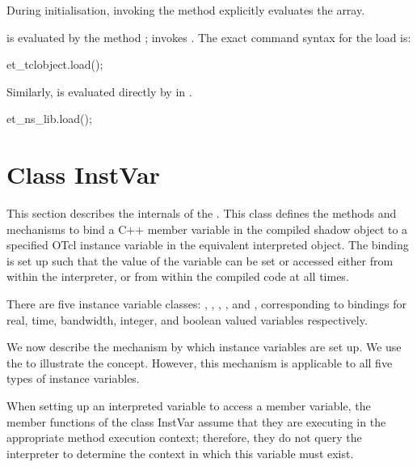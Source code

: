 During initialisation, invoking the method 
explicitly evaluates the array.
\begin{list}{---}{}
\item
  is evaluated by the method
  ;
  invokes .
  The exact command syntax for the load is:
  \begin{program}
	et_tclobject.load();
  \end{program}
\item
  Similarly,
  is evaluated directly by  in .
  \begin{program}
	et_ns_lib.load();
  \end{program}
\end{list}

\section{Class InstVar}
\label{sec:InstVar}

This section describes the internals of the .
This class defines the methods and mechanisms to bind
a C++ member variable in the compiled shadow object
to a specified OTcl instance variable in the equivalent interpreted object.
The binding is set up such that the value of the variable can be
set or accessed either from within the interpreter, or from
within the compiled code at all times.

There are five instance variable classes:
,
,
,
,
and ,
corresponding to bindings for real, time, bandwidth, integer, and
boolean valued variables respectively.

We now describe the mechanism by which instance variables are set up.
We use the 
to illustrate the concept.
However, this mechanism is applicable to all five types of instance variables.

When setting up an interpreted variable to access a member variable,
the member functions of the class InstVar assume that they are executing
in the appropriate method execution context;
therefore, they do not query the interpreter to determine the context in
which this variable must exist.

